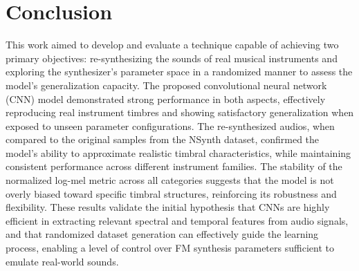 \documentclass[sigconf,natbib=false]{acmart}
\begin{document}


\section{Conclusion} \label{sec:conclusion}

This work aimed to develop and evaluate a technique capable of achieving two primary objectives: re-synthesizing the sounds of real musical instruments and exploring the synthesizer’s parameter space in a randomized manner to assess the model’s generalization capacity. The proposed convolutional neural network (CNN) model demonstrated strong performance in both aspects, effectively reproducing real instrument timbres and showing satisfactory generalization when exposed to unseen parameter configurations. The re-synthesized audios, when compared to the original samples from the NSynth dataset, confirmed the model’s ability to approximate realistic timbral characteristics, while maintaining consistent performance across different instrument families. The stability of the normalized log-mel metric across all categories suggests that the model is not overly biased toward specific timbral structures, reinforcing its robustness and flexibility. These results validate the initial hypothesis that CNNs are highly efficient in extracting relevant spectral and temporal features from audio signals, and that randomized dataset generation can effectively guide the learning process, enabling a level of control over FM synthesis parameters sufficient to emulate real-world sounds.
\end{document}

